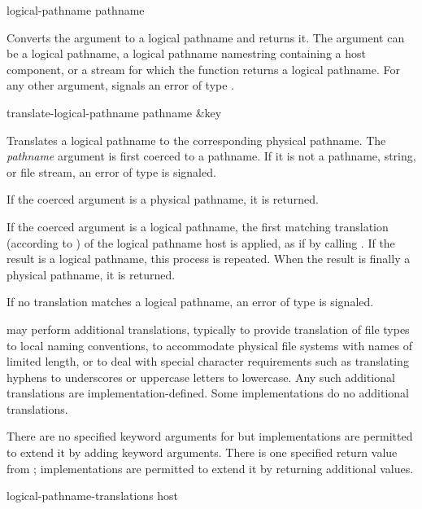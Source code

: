 \begin{newer}
\begin{defun}[Function]
logical-pathname pathname

    Converts the argument to a logical pathname and returns it.  The
    argument can be a logical pathname, a logical pathname namestring
    containing a host component, or a stream for which the 
    function returns a logical pathname.  For any other argument,
     signals an error of type .
\end{defun}

\begin{defun}[Function]
translate-logical-pathname pathname &key

    Translates a logical pathname to the corresponding physical pathname.
    The {\it pathname} argument is first coerced to a pathname.  If it is not a
    pathname, string, or file stream, an error of type  is
    signaled.

    If the coerced argument is a physical pathname, it is returned.

    If the coerced argument is a logical pathname, the first matching
    translation (according to ) of the logical pathname
    host is applied, as if by calling .  If the result is
    a logical pathname, this process is repeated.  When the result is
    finally a physical pathname, it is returned.

    If no translation matches a logical pathname,
    an error of type  is signaled.

     may perform additional translations,
    typically to provide translation of file types to local naming
    conventions, to accommodate physical file systems with names of limited length,
    or to deal with special character requirements such as
    translating hyphens to underscores or uppercase letters to lowercase.
    Any such additional translations are implementation-defined.  Some
    implementations do no additional translations.

    There are no specified keyword arguments for
     but implementations are permitted to extend
    it by adding keyword arguments.  There is one specified return value
    from ; implementations are permitted to
    extend it by returning additional values.
\end{defun}

\begin{defun}[Function]
logical-pathname-translations host


\end{defun}
\end{newer}
